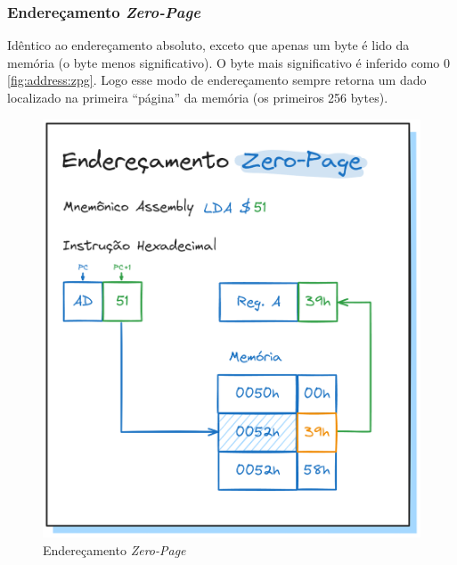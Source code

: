 \documentclass[
	12pt,				  %
	openright,		%
	a4paper,			%
	english,			%
	french,				%
	spanish,			%
	brazil,				%
]{abntex2}
\begin{document}
\subsubsection{Endereçamento \emph{Zero-Page}}
Idêntico ao endereçamento absoluto, exceto que apenas um byte é lido da memória
(o byte menos significativo). O byte mais significativo é inferido como 0
\autoref{fig:address:zpg}. Logo esse modo de endereçamento sempre retorna um
dado localizado na primeira ``página'' da memória (os primeiros 256 bytes).
\begin{figure}[h]
	\centering
	\caption{Endereçamento \emph{Zero-Page}} \label{fig:address:zpg}
	\includegraphics[scale=0.25]{../assets/img/addressing-modes-zpg.png}
\end{figure}
\end{document}
